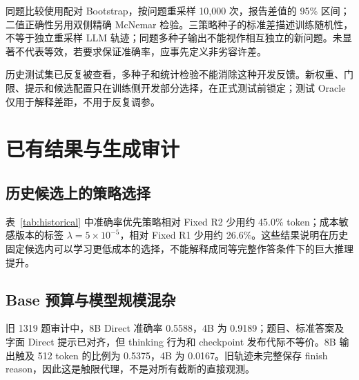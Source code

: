 \documentclass[11pt]{article}
\begin{document}
同题比较使用配对 Bootstrap，按问题重采样 10,000 次，报告差值的 95\% 区间；二值正确性另用双侧精确 McNemar 检验。三策略种子的标准差描述训练随机性，不等于独立重采样 LLM 轨迹；同题多种子输出不能视作相互独立的新问题。未显著不代表等效，若要求保证准确率，应事先定义非劣容许差。

历史测试集已反复被查看，多种子和统计检验不能消除这种开发反馈。新权重、门限、提示和候选配置只在训练侧开发部分选择，在正式测试前锁定；测试 Oracle 仅用于解释差距，不用于反复调参。

\section{已有结果与生成审计}
\subsection{历史候选上的策略选择}
\begin{table}[t]
\centering\small
\caption{历史 GSM8K 1319 题轨迹，存在 thinking/输出预算混杂，不作为新完整输出主实验。误差为三个策略种子的标准差。}
\label{tab:historical}
\end{table}

表~\ref{tab:historical} 中准确率优先策略相对 Fixed R2 少用约 45.0\% token；成本敏感版本的标签 $\lambda=5\times10^{-5}$，相对 Fixed R1 少用约 26.6\%。这些结果说明在历史固定候选内可以学习更低成本的选择，不能解释成同等完整作答条件下的巨大推理提升。

\subsection{Base 预算与模型规模混杂}
旧 1319 题审计中，8B Direct 准确率 0.5588，4B 为 0.9189；题目、标准答案及字面 Direct 提示已对齐，但 thinking 行为和 checkpoint 发布代际不等价。8B 输出触及 512 token 的比例为 0.5375，4B 为 0.0167。旧轨迹未完整保存 finish reason，因此这是触限代理，不是对所有截断的直接观测。
\end{document}
